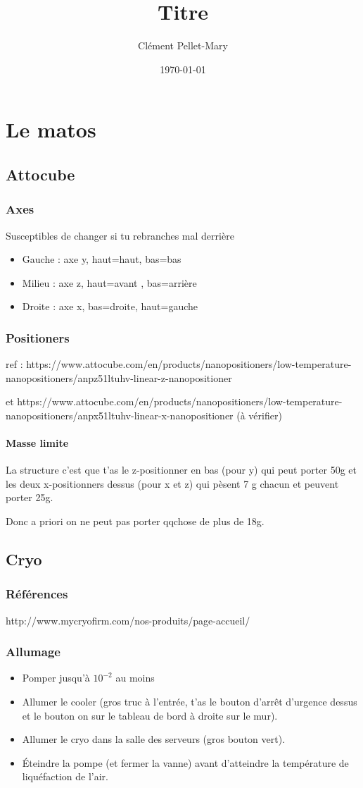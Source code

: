 \documentclass[a4paper]{report}
\title{Titre}
\author{Clément Pellet-Mary}
\date\today
\begin{document}
\chapter{Le matos}
  \section{Attocube}
  \subsection{Axes}
  Susceptibles de changer si tu rebranches mal derrière
  \begin{itemize}
  \item Gauche : axe y, haut=haut, bas=bas
  \item Milieu : axe z, haut=avant , bas=arrière
  \item Droite : axe x, bas=droite, haut=gauche
  \end{itemize}
  \subsection{Positioners}
  ref : https://www.attocube.com/en/products/nanopositioners/low-temperature-nanopositioners/anpz51ltuhv-linear-z-nanopositioner 
  
  et https://www.attocube.com/en/products/nanopositioners/low-temperature-nanopositioners/anpx51ltuhv-linear-x-nanopositioner (à vérifier)
  
  \subsubsection{Masse limite}
  La structure c'est que t'as le z-positionner en bas (pour y) qui peut porter 50g et les deux x-positionners dessus (pour x et z) qui pèsent 7 g chacun et peuvent porter 25g.
  
  Donc a priori on ne peut pas porter qqchose de plus de 18g.
  \section{Cryo}
  \subsection{Références}
  http://www.mycryofirm.com/nos-produits/page-accueil/
  \subsection{Allumage}
  \begin{itemize}
  \item Pomper jusqu'à $10^{-2}$ au moins
  \item Allumer le cooler (gros truc à l'entrée, t'as le bouton d'arrêt d'urgence dessus et le bouton on sur le tableau de bord à droite sur le mur).
  \item Allumer le cryo dans la salle des serveurs (gros bouton vert).
  \item Éteindre la pompe (et fermer la vanne) avant d'atteindre la température de liquéfaction de l'air.
  \end{itemize}
\end{document}
